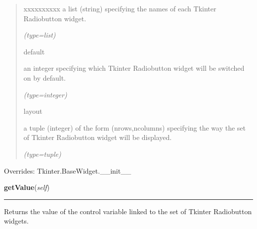 \begin{boxedminipage}{\funcwidth}
\begin{quote}
\begin{Ventry}{xxxxxxxxxx}
          a list (string) specifying the names of each Tkinter Radiobutton 
          widget.

            {\it (type=list)}

          \item[default]

          an integer specifying which Tkinter Radiobutton widget will be 
          switched on by default.

            {\it (type=integer)}

          \item[layout]

          a tuple (integer) of the form (nrows,ncolumns) specifying the way
          the set of Tkinter Radiobutton widget will be displayed.

            {\it (type=tuple)}

        \end{Ventry}

      \end{quote}

      Overrides: Tkinter.BaseWidget.\_\_init\_\_

    \end{boxedminipage}

    \label{nMOLDYN:GUI:Widgets:ComboRadiobutton:getValue}

    \vspace{0.5ex}

\hspace{.8\funcindent}\begin{boxedminipage}{\funcwidth}

    \raggedright \textbf{getValue}(\textit{self})

    \vspace{-1.5ex}

    \rule{\textwidth}{0.5\fboxrule}
\setlength{\parskip}{2ex}
    Returns the value of the control variable linked to the set of Tkinter 
    Radiobutton widgets.

\setlength{\parskip}{1ex}
    \end{boxedminipage}

    \label{nMOLDYN:GUI:Widgets:ComboRadiobutton:setValue}

